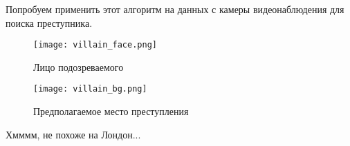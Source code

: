Попробуем применить этот алгоритм на данных с камеры видеонаблюдения для поиска преступника.

\begin{figure}[H]
	\label{villain_face}
	\texttt{[image: villain\_face.png]}
	\centering
	\caption{Лицо подозреваемого}
\end{figure}

\begin{figure}[H]
	\label{villain_bg}
	\texttt{[image: villain\_bg.png]}
	\centering
	\caption{Предполагаемое место преступления}
\end{figure}

Хмммм, не похоже на Лондон...